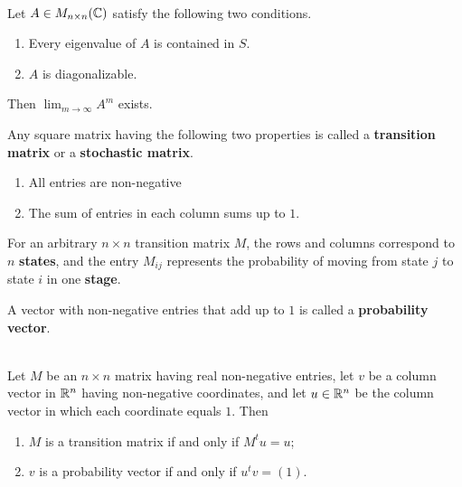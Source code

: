 \begin{theorem}
	\hfill\\
	Let $A \in M_{n \times n}(\mathbb{C})$ satisfy the following two conditions.

	\begin{enumerate}
		\item Every eigenvalue of $A$ is contained in $S$.
		\item $A$ is diagonalizable.
	\end{enumerate}

	Then $\displaystyle\lim_{m \to \infty}A^m$ exists.
\end{theorem}

\begin{definition}
	Any square matrix having the following two properties is called a \textbf{transition matrix} or a \textbf{stochastic matrix}.

	\begin{enumerate}
		\item All entries are non-negative
		\item The sum of entries in each column sums up to $1$.
	\end{enumerate}

	For an arbitrary $n \times n$ transition matrix $M$, the rows and columns correspond to $n$ \textbf{states}, and the entry $M_{ij}$ represents the probability of moving from state $j$ to state $i$ in one \textbf{stage}.
\end{definition}

\begin{definition}
	A vector with non-negative entries that add up to $1$ is called a \textbf{probability vector}.
\end{definition}

\begin{theorem}
	\hfill\\
	Let $M$ be an $n \times n$ matrix having real non-negative entries, let $v$ be a column vector in $\mathbb{R}^n$ having non-negative coordinates, and let $u \in \mathbb{R}^n$ be the column vector in which each coordinate equals $1$. Then

	\begin{enumerate}
		\item $M$ is a transition matrix if and only if $M^tu = u$;
		\item $v$ is a probability vector if and only if $u^tv = (1)$.
	\end{enumerate}
\end{theorem}

